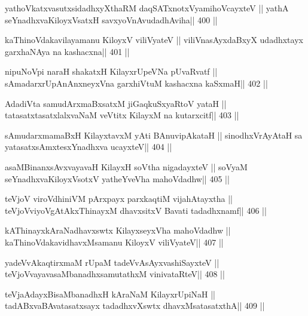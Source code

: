 \begin{shl}
yathoVkatxvasutxsidadhxyXthaRM daqSATxnotxV\s yamihoVcayxteV ||
yathA seYnadhxvaKiloyxV\s satxH savxyoVnAvudadhAviha\hfill || 400 ||
\end{shl}

\begin{shl}
kaThinoVdakavilayamanu KiloyxV viliVyateV ||
viliVnasAyxdaBxyX udadhxtayx garxhaNAya na kashacxna\hfill || 401 ||
\end{shl}

\begin{shl}
nipuNoV\s pi naraH shakatxH KilayxrUpeVNa pUvaRvatf ||
sAmadarxrUpAnAnxneyxVna garxhiVtuM kashacxna kaSxmaH\hfill || 402 ||
\end{shl}

\begin{shl}
AdadiVta samudArxmaBxsatxM jiGaqkuSxyaRtoV yataH ||
tatasatxtasatxlalxvaNaM veVtitx KilayxM na kutarxcitf\hfill || 403 ||
\end{shl}

\begin{shl}
sAmudarxmamaBxH KilayxtavxM yAti BAnuvipAkataH ||
sinodhxVrAyAtaH sa yatasatxsAmxtesxYnadhxva ucayxteV\hfill || 404 ||
\end{shl}

\begin{shl}
asaMBinanxsAvxvayavaH KilayxH soV\s tha nigadayxteV ||
soV\s yaM seYnadhxvaKiloyxV\s sotxV yatheYveVha mahoVdadhw\hfill || 405 ||
\end{shl}

\begin{shl}
teVjoV viroVdhiniVM pArxpayx parxkaqtiM vijahAtayxtha ||
teVjoVviyoVgAtAkxThinayxM dhavxsitxV Bavati tadadhxnamf\hfill || 406 ||
\end{shl}

\begin{shl}
kAThinayxkAraNadhavxswtx KilayxseyxVha mahoVdadhw ||
kaThinoVdakavidhavxMsamanu KiloyxV viliVyateV\hfill || 407 ||
\end{shl}

\begin{shl}
yadeVvAkaqtirxmaM rUpaM tadeVvAsAyxvashiSayxteV ||
teVjoVvayavasaMbanadhxsamutathxM vinivataRteV\hfill || 408 ||
\end{shl}

\begin{shl}
teVjaAdayxBisaMbanadhxH kAraNaM KilayxrUpiNaH ||
tadABxvaBAvatasatxsayx tadadhxvXswtx dhavxMsatasatxthA\hfill || 409 ||
\end{shl}

